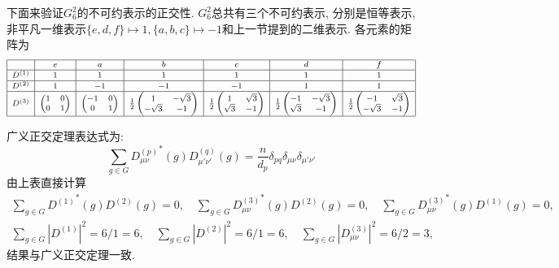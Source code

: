 \documentclass[UTF8]{ctexart}
\begin{document}
下面来验证$G_6^2$的不可约表示的正交性. $G_6^2$总共有三个不可约表示, 分别是恒等表示, 非平凡一维表示$\{e, d, f\} \mapsto 1, \{a, b, c\} \mapsto -1$和上一节提到的二维表示. 各元素的矩阵为
\begin{equation}\footnotesize
  \begin{array}{|c|c|c|c|c|c|c|}
   \hline
     & e & a & b & c & d & f \\
   \hline
   D^{(1)} & 1 & 1 & 1 & 1 & 1 & 1\\
   \hline
   D^{(2)} & 1 & -1 & -1 & -1 & 1 & 1\\
   \hline
   D^{(3)} &
   \begin{pmatrix}
     1 & 0 \\
     0 & 1
   \end{pmatrix} &
   \begin{pmatrix}
     -1 & 0 \\
     0 & 1
   \end{pmatrix} & \frac{1}{2}
   \begin{pmatrix}
     1 & -\sqrt{3} \\
     -\sqrt{3} & -1
   \end{pmatrix} & \frac{1}{2}
   \begin{pmatrix}
     1 & \sqrt{3} \\
     \sqrt{3} & -1
   \end{pmatrix} & \frac{1}{2}
   \begin{pmatrix}
     -1 & -\sqrt{3} \\
     \sqrt{3} & -1
   \end{pmatrix} & \frac{1}{2}
   \begin{pmatrix}
     -1 & \sqrt{3} \\
     -\sqrt{3} & -1
   \end{pmatrix}\\
   \hline
  \end{array}
\end{equation}

广义正交定理表达式为:
\begin{equation}
  \sum_{g \in G} {D_{\mu \nu}^{(p)}}^{*} (g) D_{\mu' \nu'}^{(q)} (g) = \frac{n}{d_p} \delta_{pq} \delta_{\mu \nu} \delta_{\mu' \nu'}
\end{equation}
由上表直接计算
\begin{gather}
  \sum_{g \in G} {D^{(1)}}^{*} (g) D^{(2)} (g) = 0,\quad \sum_{g \in G} {D^{(3)}_{\mu \nu}}^{*} (g) D^{(2)} (g) = 0,\quad \sum_{g \in G} {D^{(3)}_{\mu \nu}}^{*} (g) D^{(1)} (g) = 0, \\
  \sum_{g \in G} |D^{(1)}|^2 = 6 / 1 = 6,\quad \sum_{g \in G} |D^{(2)}|^2 = 6 / 1 = 6,\quad \sum_{g \in G} |D^{(3)}_{\mu \nu}|^2 = 6 / 2 = 3,
\end{gather}
结果与广义正交定理一致.
\end{document}
